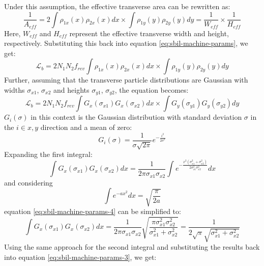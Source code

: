 Under this assumption, the effective transverse area can be rewritten as:
\begin{equation}
    \label{eq:effective-area}
    \frac{1}{A_{eff}} = 2 \int \rho_{1x}(x) \rho_{2x}(x) dx \times \int \rho_{1y}(y) \rho_{2y}(y) dy = \frac{1}{W_{eff}} \times \frac{1}{H_{eff}}
\end{equation}
Here, $W_{eff}$ and $H_{eff}$ represent the effective transverse width and height, respectively. Substituting this back into equation \ref{eq:sbil-machine-params}, we get:
\begin{equation}
    \label{eq:sbil-machine-params-2}
    \mathcal{L}_b = 2 N_1 N_2 f_{rev} \int \rho_{1x}(x) \rho_{2x}(x) dx \times \int \rho_{1y}(y) \rho_{2y}(y) dy
\end{equation}
Further, assuming that the transverse particle distributions are Gaussian with widths $\sigma_{x1}$, $\sigma_{x2}$ and heights $\sigma_{y1}$, $\sigma_{y2}$, the equation becomes:
\begin{equation}
    \label{eq:sbil-machine-params-3}
    \mathcal{L}_b = 2 N_1 N_2 f_{rev} \int G_x (\sigma_{x1}) G_x (\sigma_{x2}) dx \times \int G_y (\sigma_{y1}) G_y (\sigma_{y2}) dy
\end{equation}
$G_i (\sigma)$ in this context is the Gaussian distribution with standard deviation $\sigma$ in the $i \in {x,y}$ direction and a mean of zero:
\begin{equation}
    \label{eq:gaussian-distribution}
    G_i (\sigma) = \frac{1}{\sigma \sqrt{2 \pi}} e^{-\frac{i^2}{2 \sigma^2}}
\end{equation}
Expanding the first integral:
\begin{equation}
	\label{eq:sbil-machine-params-4}
	\int G_x (\sigma_{x1}) G_x (\sigma_{x2}) dx = \frac{1}{2 \pi \sigma_{x1} \sigma_{x2}} \int e^{-\frac{x^2 \left( \sigma_{x1}^2 + \sigma_{x2}^2 \right)}{2 \sigma_{x1}^2 \sigma_{x2}^2}} dx
\end{equation}
and considering
\begin{equation}
	\int e^{-a x^2} dx = \sqrt{\frac{\pi}{2a}}
\end{equation}
equation \ref{eq:sbil-machine-params-4} can be simplified to:
\begin{equation}
	\label{eq:sbil-machine-params-5}
	\int G_x (\sigma_{x1}) G_x (\sigma_{x2}) dx = \frac{1}{2 \pi \sigma_{x1} \sigma_{x2}} \sqrt {\frac{\pi \sigma_{x1}^2 \sigma_{x2}^2}{\sigma_{x1}^2 + \sigma_{x2}^2}} = \frac{1}{2 \sqrt{\pi} \sqrt{\sigma_{x1}^2 + \sigma_{x2}^2}}
\end{equation}
Using the same approach for the second integral and substituting the results back into equation \ref{eq:sbil-machine-params-3}, we get: 
